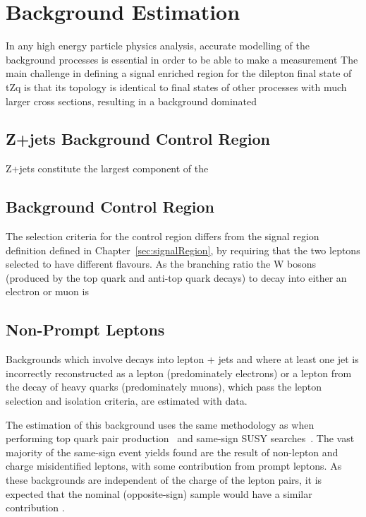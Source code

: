 \section{Background Estimation}\label{sec:bkgEst}
In any high energy particle physics analysis, accurate modelling of the background processes is essential in order to be able to make a measurement 
The main challenge in defining a signal enriched region for the dilepton final state of tZq is that its topology is identical to final states of other processes with much larger cross sections, resulting in a background dominated

\subsection{Z+jets Background Control Region}\label{subsec:zPlusJetsCR}
Z+jets constitute the largest component of the 

\subsection{\ttbar Background Control Region}\label{subsec:ttbarCR}
The selection criteria for the \ttbar control region differs from the signal region definition defined in Chapter~\ref{sec:signalRegion}, by requiring that the two leptons selected to have different flavours.
As the branching ratio the W bosons (produced by the top quark and anti-top quark decays) to decay into either an electron or muon is 

\subsection{Non-Prompt Leptons}\label{subsec:NPLs}
Backgrounds which involve decays into lepton + jets and where at least one jet is incorrectly reconstructed as a lepton (predominately electrons) or a lepton from the decay of heavy quarks (predominately muons), which pass the lepton selection and isolation criteria, are estimated with data.

The estimation of this background uses the same methodology as when performing top quark pair production~\cite{CMS:2016syx} and same-sign SUSY searches~\cite{CMS:2015vqc}.
The vast majority of the same-sign event yields found are the result of non-lepton and charge misidentified leptons, with some contribution from prompt leptons.
As these backgrounds are independent of the charge of the lepton pairs, it is expected that the nominal (opposite-sign) sample would have a similar contribution \cite{CMS:2015vqc}.

